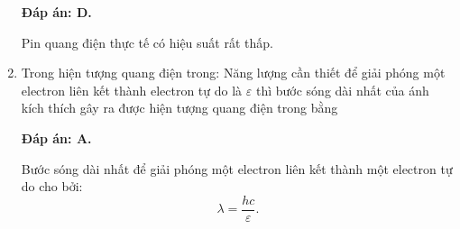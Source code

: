 \begin{enumerate}[label=\bfseries Câu \arabic*:]
	\loigiai
	{		\textbf{Đáp án: D.}
		
Pin quang điện thực tế có hiệu suất rất thấp. 
		
	}
	
	\item {} 
		\cauhoi
	{Trong hiện tượng quang điện trong: Năng lượng cần thiết để giải phóng một electron liên kết thành electron tự do là $\varepsilon$ thì bước sóng dài nhất của ánh kích thích gây ra được hiện tượng quang điện trong bằng
	}
	
	\loigiai
	{		\textbf{Đáp án: A.}
		
Bước sóng dài nhất để giải phóng một electron liên kết thành một electron tự do cho bởi:
$$
	\lambda = \dfrac{hc}{\varepsilon}.
$$
		
	}
	
\end{enumerate}


